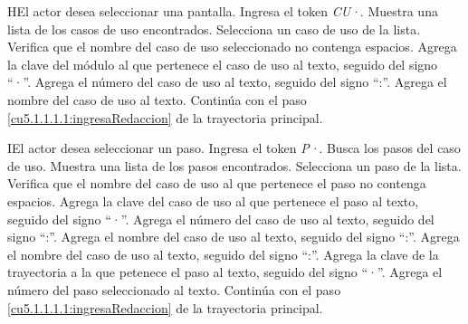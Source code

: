  \begin{UCtrayectoriaA}{H}{El actor desea seleccionar una pantalla.}
 	\UCpaso[\UCactor] Ingresa el token {\it CU·}.
  	\UCpaso[\UCsist] Muestra una lista de los casos de uso encontrados.
 	\UCpaso[\UCactor] Selecciona un caso de uso de la lista.
  	\UCpaso[\UCsist] Verifica que el nombre del caso de uso seleccionado no contenga espacios. 
  	\UCpaso[\UCsist] Agrega la clave del módulo al que pertenece el caso de uso al texto, seguido del signo ``·''.
  	\UCpaso[\UCsist] Agrega el número del caso de uso al texto, seguido del signo ``:''.
  	\UCpaso[\UCsist] Agrega el nombre del caso de uso al texto.
    \UCpaso[] Continúa con el paso \ref{cu5.1.1.1.1:ingresaRedaccion} de la trayectoria principal.
 \end{UCtrayectoriaA}
 \begin{UCtrayectoriaA}{I}{El actor desea seleccionar un paso.}
 	\UCpaso[\UCactor] Ingresa el token {\it P·}.
	\UCpaso[\UCsist] Busca los pasos del caso de uso.
  	\UCpaso[\UCsist] Muestra una lista de los pasos encontrados.
 	\UCpaso[\UCactor] Selecciona un paso de la lista.
  	\UCpaso[\UCsist] Verifica que el nombre del caso de uso al que pertenece el paso no contenga espacios. 
  	\UCpaso[\UCsist] Agrega la clave del caso de uso al que pertenece el paso al texto, seguido del signo ``·''.
  	\UCpaso[\UCsist] Agrega el número del caso de uso al texto, seguido del signo ``:''.
  	\UCpaso[\UCsist] Agrega el nombre del caso de uso al texto, seguido del signo ``:''.
  	\UCpaso[\UCsist] Agrega el nombre del caso de uso al texto, seguido del signo ``:''.
  	\UCpaso[\UCsist] Agrega la clave de la trayectoria a la que petenece el paso al texto, seguido del signo ``·''.
  	\UCpaso[\UCsist] Agrega el número del paso seleccionado al texto.
    \UCpaso[] Continúa con el paso \ref{cu5.1.1.1.1:ingresaRedaccion} de la trayectoria principal.
 \end{UCtrayectoriaA}
